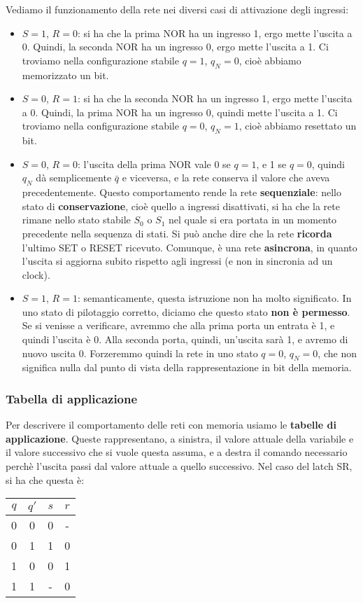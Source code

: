 \documentclass[a4paper,11pt]{article}
\begin{document}
Vediamo il funzionamento della rete nei diversi casi di attivazione degli ingressi:
\begin{itemize}
	\item $S=1$, $R=0$: si ha che la prima NOR ha un ingresso 1, ergo mette l'uscita a 0. Quindi, la seconda NOR ha un ingresso 0, ergo mette l'uscita a 1. Ci troviamo nella configurazione stabile $q=1$, $q_N = 0$, cioè abbiamo memorizzato un bit. 
	\item $S=0$, $R=1$: si ha che la seconda NOR ha un ingresso 1, ergo mette l'uscita a 0. Quindi, la prima NOR ha un ingresso 0, quindi mette l'uscita a 1. Ci troviamo nella configurazione stabile $q=0$, $q_N = 1$, cioè abbiamo resettato un bit.
	\item $S=0$, $R=0$: l'uscita della prima NOR vale 0 se $q=1$, e 1 se $q=0$, quindi $q_N$ dà semplicemente $\bar{q}$ e viceversa, e la rete conserva il valore che aveva precedentemente. Questo comportamento rende la rete \textbf{sequenziale}: nello stato di \textbf{conservazione}, cioè quello a ingressi disattivati, si ha che la rete rimane nello stato stabile $S_0$ o $S_1$ nel quale si era portata in un momento precedente nella sequenza di stati.
		Si può anche dire che la rete \textbf{ricorda} l'ultimo SET o RESET ricevuto.
		Comunque, è una rete \textbf{asincrona}, in quanto l'uscita si aggiorna subito rispetto agli ingressi (e non in sincronia ad un clock).
	\item $S=1$, $R=1$: semanticamente, questa istruzione non ha molto significato. In uno stato di pilotaggio corretto, diciamo che questo stato \textbf{non è permesso}.
		Se si venisse a verificare, avremmo che alla prima porta un entrata è 1, e quindi l'uscita è 0. Alla seconda porta, quindi, un'uscita sarà 1, e avremo di nuovo uscita 0.
		Forzeremmo quindi la rete in uno stato $q=0$, $q_N=0$, che non significa nulla dal punto di vista della rappresentazione in bit della memoria.
\end{itemize}

\subsubsection{Tabella di applicazione}
Per descrivere il comportamento delle reti con memoria usiamo le \textbf{tabelle di applicazione}.
Queste rappresentano, a sinistra, il valore attuale della variabile e il valore successivo che si vuole questa assuma, e a destra il comando necessario perchè l'uscita passi dal valore attuale a quello successivo.
Nel caso del latch SR, si ha che questa è:
\begin{table}[h!]
	\center 
	\begin{tabular} { c c | c c }
		\bfseries $q$ & \bfseries $q'$ & \bfseries $s$ & \bfseries $r$ \\
		\hline 
		0 & 0 & 0 & - \\ 
		0 & 1 & 1 & 0 \\ 
		1 & 0 & 0 & 1 \\ 
		1 & 1 & - & 0 
	\end{tabular}
\end{table}
\end{document}
